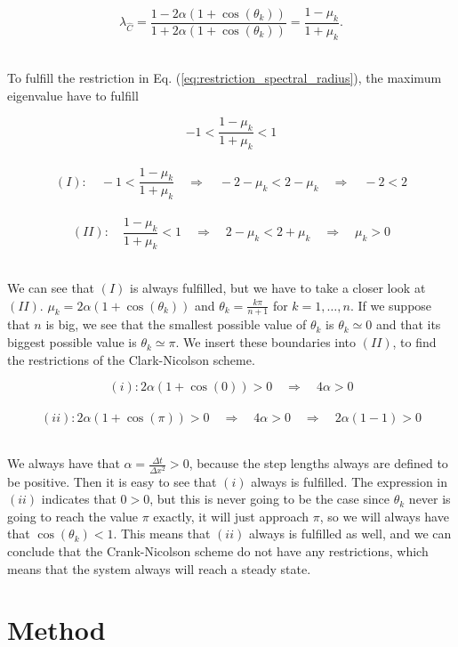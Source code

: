 \documentclass[12pt]{article}
\begin{document}
\begin{flushleft}
\vspace{5mm}
$$\lambda_{\hat{C}} = \frac{1-2\alpha(1+\cos(\theta_k))}{1+2\alpha(1+\cos(\theta_k))} = \frac{1-\mu_k}{1+\mu_k}.$$\\
\vspace{5mm}

To fulfill the restriction in Eq. (\ref{eq:restriction_spectral_radius}), the maximum eigenvalue have to fulfill 

\vspace{5mm}
$$-1 < \frac{1-\mu_k}{1+\mu_k} < 1$$\\
$$(I):\quad -1 < \frac{1-\mu_k}{1+\mu_k} \quad\Rightarrow\quad -2-\mu_k <  2-\mu_k \quad\Rightarrow\quad -2< 2$$\\
$$(II):\quad\frac{1-\mu_k}{1+\mu_k}< 1\quad\Rightarrow\quad 2-\mu_k < 2 + \mu_k \quad\Rightarrow\quad \mu_k > 0$$\\
\vspace{5mm}

We can see that $(I)$ is always fulfilled, but we have to take a closer look at $(II)$.
$\mu_k = 2\alpha(1+\cos(\theta_k))$ and $\theta_k = \frac{k\pi}{n+1}$ for $k=1,\dots ,n$. If we suppose that $n$ is big, we see that the smallest possible value of $\theta_k$ is $\theta_k \simeq 0$ and that its biggest possible value is $\theta_k \simeq \pi$. We insert these boundaries into $(II)$, to find the restrictions of the Clark-Nicolson scheme. 

\vspace{5mm}
$$(i): 2\alpha(1+\cos(0))>0 \quad\Rightarrow\quad 4\alpha > 0$$\\
$$(ii): 2\alpha(1+\cos(\pi))>0 \quad\Rightarrow\quad 4\alpha > 0 \quad\Rightarrow\quad 2\alpha(1-1) > 0$$\\
\vspace{5mm}

We always have that $\alpha = \frac{\Delta t}{\Delta x^2}>0$, because the step lengths always are defined to be positive. Then it is easy to see that $(i)$ always is fulfilled. The expression in $(ii)$
indicates that $0>0$, but this is never going to be the case since $\theta_k$ never is going to reach the value $\pi$ exactly, it will just approach $\pi$, so we will always have that $\cos(\theta_k)<1$. This means that $(ii)$ always is fulfilled as well, and we can conclude that the Crank-Nicolson scheme do not have any restrictions, which means that the system always will reach a steady state.

\newpage

\section{Method}

\end{flushleft}
\end{document}
